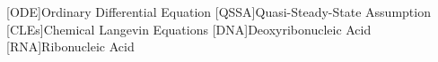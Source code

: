 \begin{acronym}

  [ODE]{Ordinary Differential Equation}
  [QSSA]{Quasi-Steady-State Assumption}
  [CLEs]{Chemical Langevin Equations}
  [DNA]{Deoxyribonucleic Acid}
  [RNA]{Ribonucleic Acid}

\end{acronym}

